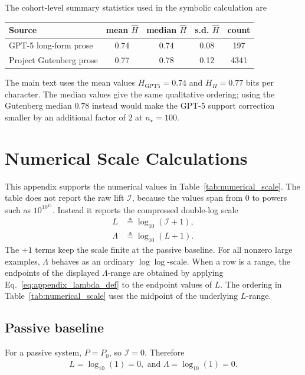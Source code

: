 \documentclass[
  aps,
  prresearch,
  reprint,
  amsmath,
  amssymb,
  superscriptaddress,
  nofootinbib,
  longbibliography
]{revtex4-2}
\def\EQSP{3pt}
\newcommand{\cgather}[2][\EQSP]{\begingroup\setlength\abovedisplayskip{#1}\setlength\belowdisplayskip{#1}\begin{gather} #2 \end{gather}\endgroup\noindent}
\newcommand{\calI}{\mathcal{I}}
\begin{document}
The cohort-level summary statistics used in the symbolic calculation are
\begin{center}
\scriptsize
\setlength{\tabcolsep}{2pt}
\begin{tabular}{@{}lcccc@{}}
\toprule
Source & mean \(\widehat H\) & median \(\widehat H\) & s.d. \(\widehat H\) & count\\
\midrule
GPT-5 long-form prose & 0.74 & 0.74 & 0.08 & 197\\
Project Gutenberg prose & 0.77 & 0.78 & 0.12 & 4341\\
\bottomrule
\end{tabular}
\end{center}
The main text uses the mean values \(H_{\mathrm{GPT5}}=0.74\) and \(H_H=0.77\) bits per character. The median values give the same qualitative ordering; using the Gutenberg median \(0.78\) instead would make the GPT-5 support correction smaller by an additional factor of \(2\) at \(n_\star=100\).

\section{Numerical Scale Calculations}
\label{app:numerical_scales}

This appendix supports the numerical values in Table~\ref{tab:numerical_scale}. The table does not report the raw lift \(\calI\), because the values span from \(0\) to powers such as \(10^{10^{15}}\). Instead it reports the compressed double-log scale
\begin{align}
    L &\triangleq  \log_{10}(\calI+1), \label{eq:appendix_L_def}\\
    \Lambda &\triangleq  \log_{10}(L+1). \label{eq:appendix_lambda_def}
\end{align}
The \(+1\) terms keep the scale finite at the passive baseline. For all nonzero large examples, \(\Lambda\) behaves as an ordinary \(\log\log\)-scale. When a row is a range, the endpoints of the displayed \(\Lambda\)-range are obtained by applying Eq.~\eqref{eq:appendix_lambda_def} to the endpoint values of \(L\). The ordering in Table~\ref{tab:numerical_scale} uses the midpoint of the underlying \(L\)-range.

\subsection{Passive baseline}

For a passive system, \(P=P_0\), so \(\calI=0\). Therefore
\cgather{
    L = \log_{10}(1)=0,  \text{ and }
    \Lambda = \log_{10}(1)=0.
}
\end{document}
